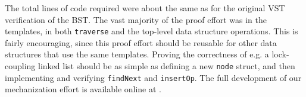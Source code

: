 \documentclass[a4paper,UKenglish,cleveref, autoref, thm-restate]{lipics-v2021}
\newcommand{\wm}[1]{\textbf{\textcolor{violet}{[William: #1]}}}
\begin{document}

The total lines of code required were about the same as for the original VST verification of the BST. The vast majority of the proof effort was in the templates, in both \lstinline{traverse} and the top-level data structure operations. This is fairly encouraging, since this proof effort should be reusable for other data structures that use the same templates.
Proving the correctness of e.g. a lock-coupling linked list should be as simple as defining a new \lstinline{node} struct, and then implementing and verifying \lstinline{findNext} and \lstinline{insertOp}.
The full development of our mechanization effort is available online at
\href{https://github.com/PrincetonUniversity/DeepSpecDB/tree/master/concurrency/templates}{\color{blue}{https://github.com/PrincetonUniversity/DeepSpecDB/tree/master/concurrency/templates}}.
\end{document}
